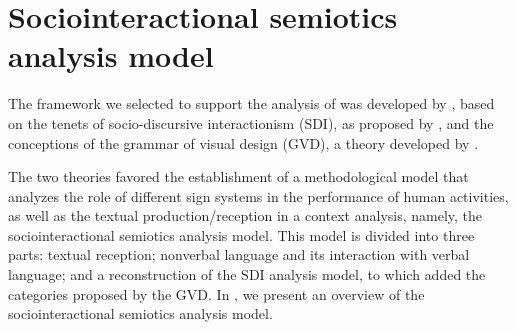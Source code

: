 \documentclass[english]{textolivre}
\begin{document}
\section{Sociointeractional semiotics analysis model}

The framework we selected to support the analysis of \textcite{purl} was developed by \textcite{leal2011organizaccao}, based on the tenets of socio-discursive interactionism (SDI), as proposed by \textcite{bronckart2012}, and the conceptions of the grammar of visual design (GVD), a theory developed by \textcite{kress2006reading}. 

 The two theories favored the establishment of a methodological model that analyzes the role of different sign systems in the performance of human activities, as well as the textual production/reception in a context analysis, namely, the sociointeractional semiotics analysis model. This model is divided into three parts: textual reception; nonverbal language and its interaction with verbal language; and a reconstruction of the SDI analysis model, to which \textcite{leal2011organizaccao} added the categories proposed by the GVD. In , we present an overview of the sociointeractional semiotics analysis model.
\end{document}
